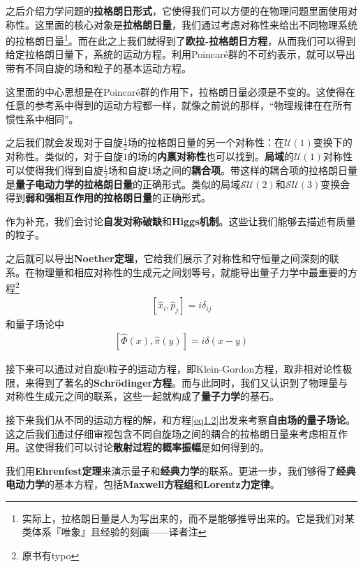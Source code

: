 之后介绍力学问题的{\bf 拉格朗日形式}，它使得我们可以方便的在物理问题里面使用对称性。这里面的核心对象是{\bf 拉格朗日量}，我们通过考虑对称性来给出不同物理系统的拉格朗日量\footnote{实际上，拉格朗日量是人为写出来的，而不是能够推导出来的。它是我们对某类体系『唯象』且经验的刻画——译者注}。而在此之上我们就得到了{\bf 欧拉-拉格朗日方程}，从而我们可以得到给定拉格朗日量下，系统的运动方程。利用Poincaré群的不可约表示，就可以导出带有不同自旋的场和粒子的基本运动方程。

这里面的中心思想是在Poincaré群的作用下，拉格朗日量必须是不变的。这使得在任意的参考系中得到的运动方程都一样，就像之前说的那样，“物理规律在在所有惯性系中相同”。

之后我们就会发现对于自旋$\tfrac{1}{2}$场的拉格朗日量的另一个对称性：在$\mathcal{U}(1)$变换下的对称性。类似的，对于自旋$1$的场的{\bf 内禀对称性}也可以找到。{\bf 局域}的$\mathcal{U}(1)$对称性可以使得我们得到自旋$\tfrac{1}{2}$场和自旋$1$场之间的{\bf 耦合项}。带这样的耦合项的拉格朗日量是{\bf 量子电动力学的拉格朗日量}的正确形式。类似的局域$\mathcal{SU}(2)$和$\mathcal{SU}(3)$变换会得到{\bf 弱和强相互作用的拉格朗日量}的正确形式。

作为补充，我们会讨论{\bf 自发对称破缺}和{\bf Higgs机制}。这些让我们能够去描述有质量的粒子。

之后就可以导出{\bf Noether定理}，它给我们展示了对称性和守恒量之间深刻的联系。在物理量和相应对称性的生成元之间划等号，就能导出量子力学中最重要的方程\footnote{原书有typo}
\begin{align}\label{eq1.1}
[\hat{x}_i,\hat{p}_j]=i\delta_{ij}
\end{align}
和量子场论中
\begin{align}\label{eq1.2}
[\hat{\Phi}(x),\hat{\pi}(y)]=i\delta(x-y)
\end{align}

接下来可以通过对自旋$0$粒子的运动方程，即Klein-Gordon方程，取非相对论性极限，来得到了著名的{\bf Schrödinger方程}。而与此同时，我们又认识到了物理量与对称性生成元之间的联系，这些一起就构成了{\bf 量子力学}的基石。

接下来我们从不同的运动方程的解，和方程\eqref{eq1.2}出发来考察{\bf 自由场的量子场论}。这之后我们通过仔细审视包含不同自旋场之间的耦合的拉格朗日量来考虑相互作用。这使得我们可以讨论{\bf 散射过程的概率振幅}是如何得到的。

我们用{\bf Ehrenfest定理}来演示量子和{\bf 经典力学}的联系。更进一步，我们够得了{\bf 经典电动力学}的基本方程，包括{\bf Maxwell方程组}和{\bf Lorentz力定律}。


